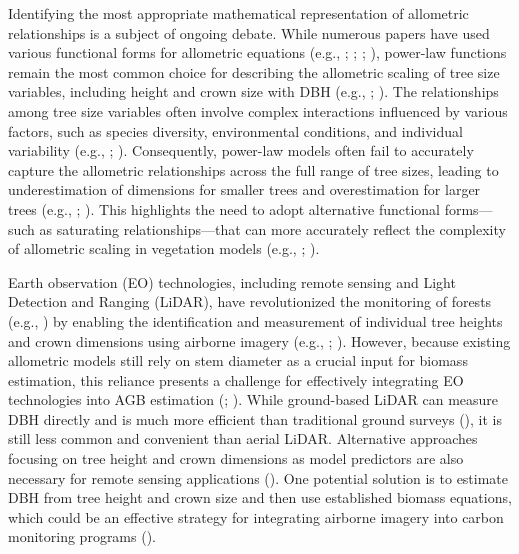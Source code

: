 \documentclass[
  12pt,
  letterpaper,
  DIV=11,
  numbers=noendperiod]{scrartcl}
\begin{document}
Identifying the most appropriate mathematical representation of
allometric relationships is a subject of ongoing debate. While numerous
papers have used various functional forms for allometric equations
(e.g., ;
;
;
), power-law functions remain
the most common choice for describing the allometric scaling of tree
size variables, including height and crown size with DBH (e.g.,
;
). The relationships among
tree size variables often involve complex interactions influenced by
various factors, such as species diversity, environmental conditions,
and individual variability (e.g., ; ).
Consequently, power-law models often fail to accurately capture the
allometric relationships across the full range of tree sizes, leading to
underestimation of dimensions for smaller trees and overestimation for
larger trees (e.g., ;
). This highlights the need to
adopt alternative functional forms---such as saturating
relationships---that can more accurately reflect the complexity of
allometric scaling in vegetation models (e.g.,
;
).

Earth observation (EO) technologies, including remote sensing and Light
Detection and Ranging (LiDAR), have revolutionized the monitoring of
forests (e.g., ) by
enabling the identification and measurement of individual tree heights
and crown dimensions using airborne imagery (e.g.,
;
). However, because
existing allometric models still rely on stem diameter as a crucial
input for biomass estimation, this reliance presents a challenge for
effectively integrating EO technologies into AGB estimation
(;
). While ground-based LiDAR
can measure DBH directly and is much more efficient than traditional
ground surveys (), it is
still less common and convenient than aerial LiDAR. Alternative
approaches focusing on tree height and crown dimensions as model
predictors are also necessary for remote sensing applications
(). One potential solution
is to estimate DBH from tree height and crown size and then use
established biomass equations, which could be an effective strategy for
integrating airborne imagery into carbon monitoring programs
().
\end{document}
